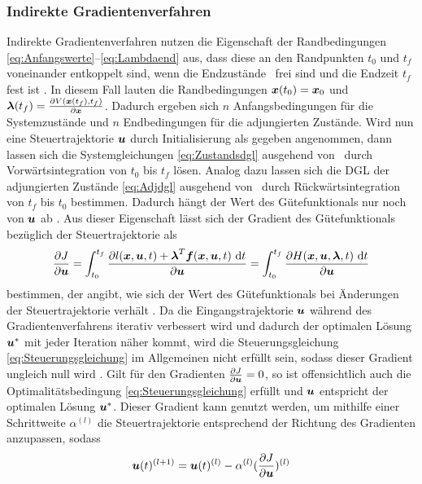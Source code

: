 \subsubsection{Indirekte Gradientenverfahren}\label{subsubsec:Gradientenverfahren_indirekt}
Indirekte Gradientenverfahren nutzen die Eigenschaft der Randbedingungen \eqref{eq:Anfangswerte}--\eqref{eq:Lambdaend} aus, dass diese an den Randpunkten $t_0$ und $t_f$ voneinander entkoppelt sind, wenn die Endzustände \xoftf~frei sind und die Endzeit $t_f$ fest ist \cite{KnutGraichen.2012}. In diesem Fall lauten die Randbedingungen $\boldsymbol{x}(t_0) = \boldsymbol{x}_0$ und $\boldsymbol{\lambda}(t_f) = \frac{\partial V(\boldsymbol{x}(t_f),t_f)}{\partial \boldsymbol{x}}$. Dadurch ergeben sich $n$ Anfangsbedingungen für die Systemzustände und $n$ Endbedingungen für die adjungierten Zustände. Wird nun eine Steuertrajektorie $\boldsymbol{u}$ durch Initialisierung als gegeben angenommen, dann lassen sich die Systemgleichungen \eqref{eq:Zustandsdgl} ausgehend von \xzero~durch Vorwärtsintegration von $t_0$ bis $t_f$ lösen. Analog dazu lassen sich die \gls{DGL} der adjungierten Zustände \eqref{eq:Adjdgl} ausgehend von \lambdaoftf~durch Rückwärtsintegration von $t_f$ bis $t_0$ bestimmen. Dadurch hängt der Wert des Gütefunktionals nur noch von $\boldsymbol{u}$ ab \cite{Papageorgiou.2012}. Aus dieser Eigenschaft lässt sich der Gradient des Gütefunktionals bezüglich der Steuertrajektorie als
\begin{equation}
	\frac{\partial J}{\partial \boldsymbol{u}} = \int_{t_0}^{t_f}\frac{\partial l(\boldsymbol{x},\boldsymbol{u},t) + \boldsymbol{\lambda}^T\boldsymbol{f}(\boldsymbol{x},\boldsymbol{u},t)~\textrm{d}{t}}{\partial \boldsymbol{u}} = \int_{t_0}^{t_f}\frac{\partial H(\boldsymbol{x},\boldsymbol{u},\boldsymbol{\lambda},t)~\textrm{d}{t}}{\partial \boldsymbol{u}}
\end{equation}
bestimmen, der angibt, wie sich der Wert des Gütefunktionals bei Änderungen der Steuertrajektorie verhält \cite{Papageorgiou.2012}. Da die Eingangstrajektorie $\boldsymbol{u}$ während des Gradientenverfahrens iterativ verbessert wird und dadurch der optimalen Lösung $\boldsymbol{u}^*$ mit jeder Iteration näher kommt, wird die Steuerungsgleichung \eqref{eq:Steuerungsgleichung} im Allgemeinen nicht erfüllt sein, sodass dieser Gradient ungleich null wird \cite{KnutGraichen.2012}. Gilt für den Gradienten $\frac{\partial J}{\partial \boldsymbol{u}} = 0$, so ist offensichtlich auch die Optimalitätsbedingung \eqref{eq:Steuerungsgleichung} erfüllt und $\boldsymbol{u}$ entspricht der optimalen Lösung $\boldsymbol{u}^*$. Dieser Gradient kann genutzt werden, um mithilfe einer Schrittweite $\alpha^{(l)}$ die Steuertrajektorie entsprechend der Richtung des Gradienten anzupassen, sodass  
\begin{equation}
\boldsymbol{u}(t)^{(l+1)} = \boldsymbol{u}(t)^{(l)} - \alpha^{(l)}(\frac{\partial J}{\partial \boldsymbol{u}})^{(l)}
\end{equation}
